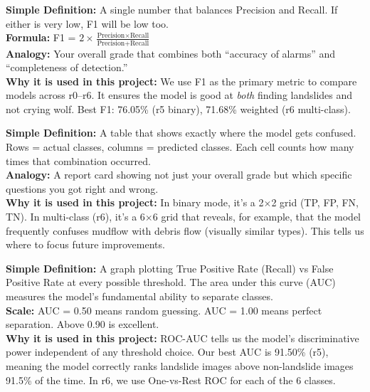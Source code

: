 \documentclass[11pt]{article}
\begin{document}
\begin{description}[style=nextline, leftmargin=1.5cm]
    \item[\textbf{F1 Score}]
    \textbf{Simple Definition:} A single number that balances Precision and Recall. If either is very low, F1 will be low too.\\
    \textbf{Formula:} F1 = $2 \times \frac{\text{Precision} \times \text{Recall}}{\text{Precision} + \text{Recall}}$\\
    \textbf{Analogy:} Your overall grade that combines both ``accuracy of alarms'' and ``completeness of detection.''\\
    \textbf{Why it is used in this project:} We use F1 as the primary metric to compare models across r0--r6. It ensures the model is good at \emph{both} finding landslides and not crying wolf. Best F1: 76.05\% (r5 binary), 71.68\% weighted (r6 multi-class).

    \item[\textbf{Confusion Matrix}]
    \textbf{Simple Definition:} A table that shows exactly where the model gets confused. Rows = actual classes, columns = predicted classes. Each cell counts how many times that combination occurred.\\
    \textbf{Analogy:} A report card showing not just your overall grade but which specific questions you got right and wrong.\\
    \textbf{Why it is used in this project:} In binary mode, it's a 2$\times$2 grid (TP, FP, FN, TN). In multi-class (r6), it's a 6$\times$6 grid that reveals, for example, that the model frequently confuses mudflow with debris flow (visually similar types). This tells us where to focus future improvements.

    \item[\textbf{ROC Curve (Receiver Operating Characteristic)}]
    \textbf{Simple Definition:} A graph plotting True Positive Rate (Recall) vs False Positive Rate at every possible threshold. The area under this curve (AUC) measures the model's fundamental ability to separate classes.\\
    \textbf{Scale:} AUC = 0.50 means random guessing. AUC = 1.00 means perfect separation. Above 0.90 is excellent.\\
    \textbf{Why it is used in this project:} ROC-AUC tells us the model's discriminative power independent of any threshold choice. Our best AUC is 91.50\% (r5), meaning the model correctly ranks landslide images above non-landslide images 91.5\% of the time. In r6, we use One-vs-Rest ROC for each of the 6 classes.


\end{description}
\end{document}
